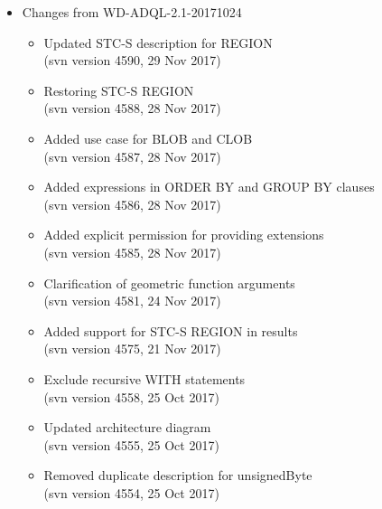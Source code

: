 \documentclass[11pt,a4paper]{ivoa}
\begin{document}
\begin{itemize}

    \item Changes from WD-ADQL-2.1-20171024
        \begin{itemize}
            \item Updated STC-S description for REGION\\
            (svn version 4590, 29 Nov 2017)
            \item Restoring STC-S REGION\\
            (svn version 4588, 28 Nov 2017)
            \item Added use case for BLOB and CLOB\\
            (svn version 4587, 28 Nov 2017)
            \item Added expressions in ORDER BY and GROUP BY clauses\\
            (svn version 4586, 28 Nov 2017)
            \item Added explicit permission for providing extensions\\
            (svn version 4585, 28 Nov 2017)
            \item Clarification of geometric function arguments\\
            (svn version 4581, 24 Nov 2017)
            \item Added support for STC-S REGION in results\\
            (svn version 4575, 21 Nov 2017)
            \item Exclude recursive WITH statements\\
            (svn version 4558, 25 Oct 2017)
            \item Updated architecture diagram\\
            (svn version 4555, 25 Oct 2017)
            \item Removed duplicate description for unsignedByte\\
            (svn version 4554, 25 Oct 2017)
        \end{itemize}


\end{itemize}
\end{document}
